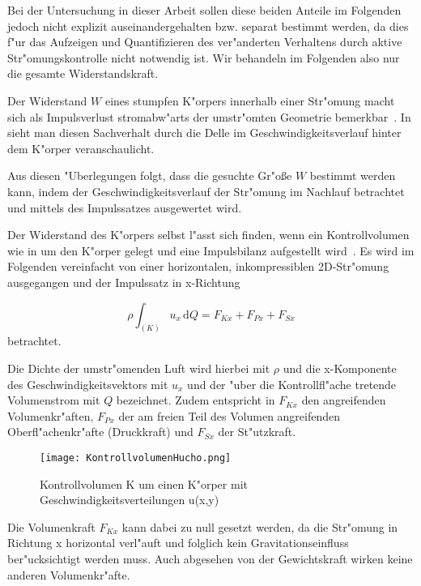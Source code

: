 Bei der Untersuchung in dieser Arbeit sollen diese beiden Anteile im Folgenden jedoch nicht explizit auseinandergehalten bzw. separat bestimmt werden, da dies f"ur das Aufzeigen und Quantifizieren des ver"anderten Verhaltens durch aktive Str"omungskontrolle nicht notwendig ist.  Wir behandeln im Folgenden also nur die gesamte Widerstandskraft.

Der Widerstand $W$ eines stumpfen K"orpers innerhalb einer Str"omung macht sich als Impulsverlust stromabw"arts der umstr"omten Geometrie bemerkbar~\cite{Hucho.2011}. In  sieht man diesen Sachverhalt durch die Delle im Geschwindigkeitsverlauf hinter dem K"orper veranschaulicht. %

Aus diesen "Uberlegungen folgt, dass die gesuchte Gr"o\ss{}e $W$ bestimmt werden kann, indem der Geschwindigkeitsverlauf der Str"omung im Nachlauf betrachtet und mittels des Impulssatzes ausgewertet wird. 

Der Widerstand des K"orpers selbst l"asst sich finden, wenn ein Kontrollvolumen wie in  um den K"orper gelegt und eine Impulsbilanz aufgestellt wird~\cite{Hucho.2011}. Es wird im Folgenden vereinfacht von einer horizontalen, inkompressiblen 2D-Str"omung ausgegangen und der Impulssatz in x-Richtung

\begin{equation}
	\label{eq:impulssatz_allg}
	\rho \int_{(K)} u_x \, \mathrm{d}Q = F_{Kx} + F_{Px} + F_{Sx}
\end{equation}
betrachtet.

Die Dichte der umstr"omenden Luft wird hierbei mit $\rho$ und die x-Komponente des Geschwindigkeitsvektors mit $u_x$ und der "uber die Kontrollfl"ache tretende Volumenstrom mit $Q$ bezeichnet.
Zudem entspricht in  $F_{Kx}$ den angreifenden Volumenkr"aften, $F_{Px}$ der am freien Teil des Volumen angreifenden Oberfl"achenkr"afte (Druckkraft) und $F_{Sx}$ der St"utzkraft.

\begin{figure}[h]
	\centering
	\texttt{[image: KontrollvolumenHucho.png]}
	\caption{Kontrollvolumen K um einen K"orper mit Geschwindigkeitsverteilungen u(x,y)~\cite{Hucho.2011}}
	\label{fig:HuchoKV}
\end{figure}

Die Volumenkraft $F_{Kx}$ kann dabei zu null gesetzt werden, da die Str"omung in Richtung x horizontal verl"auft und folglich kein Gravitationseinfluss ber"ucksichtigt werden muss. Auch abgesehen von der Gewichtskraft wirken keine anderen Volumenkr"afte.

